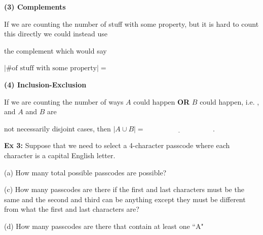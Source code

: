 \documentclass[fleqn]{article}
\newcommand{\DarkPurple}[1]{\textcolor{DarkPurple}{#1}}
\theoremstyle{definition}
\begin{document}
{{\vspace{1.5cm}

\textbf{(3) Complements} 

\vspace{.25cm}
If we are counting the number of stuff with some property, but it is hard to count this directly we could instead use 

\vspace{.25cm} 
the \DarkPurple{complement} which would say 

\vspace{.25cm} 
\hspace{1cm} $| \text{\# of stuff with some property} | =  $

\vspace{3.5cm}

\textbf{(4) Inclusion-Exclusion} 

\vspace{.25cm}
If we are counting the number of ways $A$ could happen \textbf{OR} $B$ could happen, i.e. \underline{\hspace{1.5cm}}, and $A$ and $B$ are

\vspace{.25cm} 
not necessarily disjoint cases, then $|A \cup B| = \underline{\hspace{4cm}}$. 
\vspace{3.5cm}  
}}










\newpage




\textbf{Ex 3:} Suppose that we need to select a 4-character passcode where each character is a capital English letter. 

\vspace{.25cm}
(a) How many total possible passcodes are possible?

\vspace{3cm} 

(c) How many passcodes are there if the first and last characters must be the same and the second and third can be anything except they must be different from what the first and last characters are?

\vspace{5cm} 


(d) How many passcodes are there that contain at least one ``A"
\end{document}
